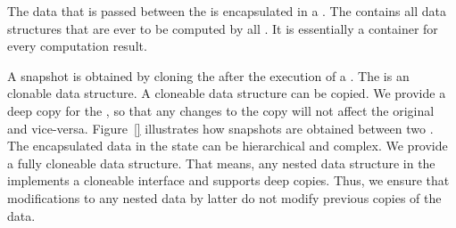 \documentclass[../03-Architecture.tex]{subfiles}
\begin{document}

The data that is passed between the  is
encapsulated in a . The
 contains all data structures that are
ever to be computed by all . It is
essentially a container for every computation result.

A snapshot is obtained by cloning the 
after the execution of a . The
 is an clonable data structure. A
cloneable data structure can be copied. We provide a deep
copy for the , so that any changes to
the copy will not affect the original and vice-versa.
Figure~\ref{}  illustrates
how snapshots are obtained between two
. The encapsulated data in the state
can be hierarchical and complex. We provide a fully
cloneable data structure. That means, any nested data
structure in the  implements a
cloneable interface and supports deep copies. Thus, we
ensure that modifications to any nested data by latter
 do not modify previous copies of the
data.




\end{document}
